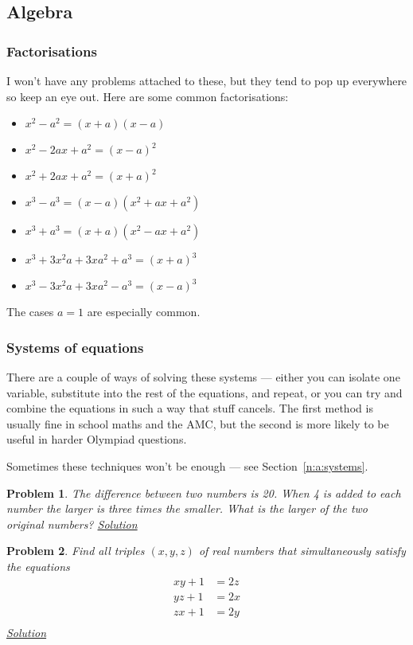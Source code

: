 \documentclass{amsart}
\newtheorem{problem}{Problem}[subsubsection]
\begin{document}
\subsection{Algebra}
\subsubsection{Factorisations}
I won't have any problems attached to these, but they tend to pop up everywhere
so keep an eye out. Here are some common factorisations:
\begin{itemize}
  \item $x^2-a^2=(x+a)(x-a)$
  \item $x^2-2ax+a^2=(x-a)^2$
  \item $x^2+2ax+a^2=(x+a)^2$
  \item $x^3-a^3=(x-a)(x^2+ax+a^2)$
  \item $x^3+a^3=(x+a)(x^2-ax+a^2)$
  \item $x^3+3x^2a+3xa^2+a^3=(x+a)^3$
  \item $x^3-3x^2a+3xa^2-a^3=(x-a)^3$
\end{itemize}
The cases $a=1$ are especially common.
\subsubsection{Systems of equations}
There are a couple of ways of solving these systems --- either you can
isolate one variable, substitute into the rest of the equations, and repeat, or
you can try and combine the equations in such a way that stuff cancels. The
first method is usually fine in school maths and the AMC, but the second is more
likely to be useful in harder Olympiad questions.

Sometimes these techniques won't be enough --- see Section~\ref{n:a:systems}.
\begin{problem}\label{p:b:a:systems:1}
  The difference between two numbers is 20. When 4 is added to each number the
  larger is three times the smaller. What is the larger of the two original
  numbers?
  \hyperlink{s:b:a:systems:1}{Solution}
\end{problem}
\begin{problem}\label{p:b:a:systems:2}
  Find all triples $(x,y,z)$ of real numbers that simultaneously satisfy the
  equations
  \begin{align*}
    xy+1&=2z \\
    yz+1&=2x \\
    zx+1&=2y \\
  \end{align*}
  \hyperlink{s:b:a:systems:2}{Solution}
\end{problem}
\end{document}
